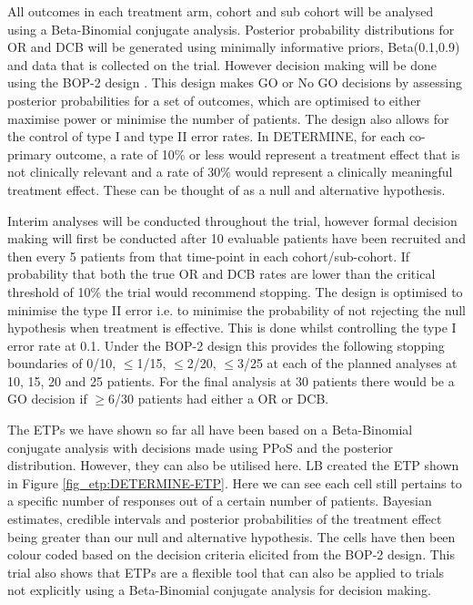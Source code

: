 All outcomes in each treatment arm, cohort and sub cohort will be analysed using a Beta-Binomial conjugate analysis. Posterior probability distributions for OR and DCB will be generated using minimally informative priors, Beta(0.1,0.9) and data that is collected on the trial. However decision making will be done using the BOP-2 design \cite{zhouBOP2BayesianOptimal2017}. This design makes GO or No GO decisions by assessing posterior probabilities for a set of outcomes, which are optimised to either maximise power or minimise the number of patients. The design also allows for the control of type I and type II error rates. In DETERMINE, for each co-primary outcome, a rate of 10\% or less would represent a treatment effect that is not clinically relevant and a rate of 30\% would represent a clinically meaningful treatment effect. These can be thought of as a null and alternative hypothesis. 

Interim analyses will be conducted throughout the trial, however formal decision making will first be conducted after 10 evaluable patients have been recruited and then every 5 patients from that time-point in each cohort/sub-cohort. If probability that both the true OR and DCB rates are lower than the critical threshold of 10\% the trial would recommend stopping. The design is optimised to minimise the type II error i.e. to minimise the probability of not rejecting the null hypothesis when treatment is effective. This is done whilst controlling the type I error rate at 0.1. Under the BOP-2 design this provides the following stopping boundaries of 0/10, $\leq$1/15, $\leq$2/20, $\leq$3/25 at each of the planned analyses at 10, 15, 20 and 25 patients. For the final analysis at 30 patients there would be a GO decision if $\geq$6/30 patients had either a OR or DCB.   

The ETPs we have shown so far all have been based on a Beta-Binomial conjugate analysis with decisions made using PPoS and the posterior distribution. However, they can also be utilised here. LB created the ETP shown in Figure \ref{fig_etp:DETERMINE-ETP}. Here we can see each cell still pertains to a specific number of responses out of a certain number of patients. Bayesian estimates, credible intervals and posterior probabilities of the treatment effect being greater than our null and alternative hypothesis. The cells have then been colour coded based on the decision criteria elicited from the BOP-2 design. This trial also shows that ETPs are a flexible tool that can also be applied to trials not explicitly using a Beta-Binomial conjugate analysis for decision making. 

